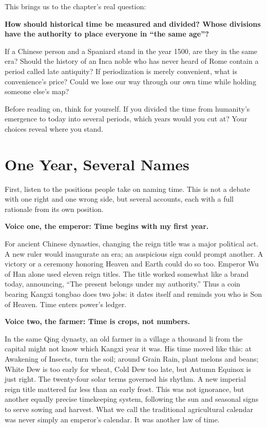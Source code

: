 This brings us to the chapter's real question:

\textbf{How should historical time be measured and divided? Whose divisions have the authority to place everyone in ``the same age''?}

If a Chinese person and a Spaniard stand in the year 1500, are they in the same era? Should the history of an Inca noble who has never heard of Rome contain a period called late antiquity? If periodization is merely convenient, what is convenience's price? Could we lose our way through our own time while holding someone else's map?

Before reading on, think for yourself. If you divided the time from humanity's emergence to today into several periods, which years would you cut at? Your choices reveal where you stand.

\section{One Year, Several Names}
First, listen to the positions people take on naming time. This is not a debate with one right and one wrong side, but several accounts, each with a full rationale from its own position.

\textbf{Voice one, the emperor: Time begins with my first year.}

For ancient Chinese dynasties, changing the reign title was a major political act. A new ruler would inaugurate an era; an auspicious sign could prompt another. A victory or a ceremony honoring Heaven and Earth could do so too. Emperor Wu of Han alone used eleven reign titles. The title worked somewhat like a brand today, announcing, ``The present belongs under my authority.'' Thus a coin bearing Kangxi tongbao does two jobs: it dates itself and reminds you who is Son of Heaven. Time enters power's ledger.

\textbf{Voice two, the farmer: Time is crops, not numbers.}

In the same Qing dynasty, an old farmer in a village a thousand li from the capital might not know which Kangxi year it was. His time moved like this: at Awakening of Insects, turn the soil; around Grain Rain, plant melons and beans; White Dew is too early for wheat, Cold Dew too late, but Autumn Equinox is just right. The twenty-four solar terms governed his rhythm. A new imperial reign title mattered far less than an early frost. This was not ignorance, but another equally precise timekeeping system, following the sun and seasonal signs to serve sowing and harvest. What we call the traditional agricultural calendar was never simply an emperor's calendar. It was another law of time.

